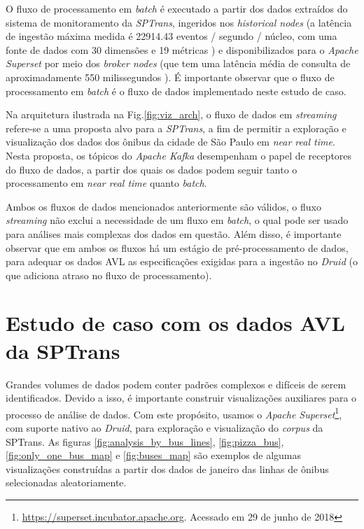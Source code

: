 \documentclass[
	12pt,				%
	oneside,			%
	a4paper,			%
	english,			%
	brazil				%
	]{abntex2ppgsi}
\begin{document}
{{O fluxo de processamento em \textit{batch} é executado a partir dos dados extraídos do sistema de monitoramento da \textit{SPTrans}, ingeridos nos \textit{historical nodes} (a latência de ingestão máxima medida é 22914.43 eventos / segundo / núcleo, com uma fonte de dados com 30 dimensões e 19 métricas \cite{yang2014druid}) e disponibilizados para o \textit{Apache Superset} por meio dos \textit{broker nodes} (que tem uma latência média de consulta de aproximadamente 550 milissegundos \cite{yang2014druid}). É importante observar que o fluxo de processamento em \textit{batch} é o fluxo de dados implementado neste estudo de caso.

Na arquitetura ilustrada na Fig.\ref{fig:viz_arch}, o fluxo de dados em \textit{streaming} refere-se a uma proposta alvo para a \textit{SPTrans}, a fim de permitir a exploração e visualização dos dados dos ônibus da cidade de São Paulo em \textit{near real time}. Nesta proposta, os tópicos do \textit{Apache Kafka} desempenham o papel de receptores do fluxo de dados, a partir dos quais os dados podem seguir tanto o processamento em \textit{near real time} quanto \textit{batch}.

Ambos os fluxos de dados mencionados anteriormente são válidos, o fluxo \textit{streaming} não exclui a necessidade de um fluxo em \textit{batch}, o qual pode ser usado para análises mais complexas dos dados em questão. Além disso, é importante observar que em ambos os fluxos há um estágio de pré-processamento de dados, para adequar os dados AVL as especificações exigidas para a ingestão no \textit{Druid} (o que adiciona atraso no fluxo de processamento).

\section{Estudo de caso com os dados AVL da SPTrans}
\label{viz_case}

Grandes volumes de dados podem conter padrões complexos e difíceis de serem identificados. Devido a isso, é importante construir visualizações auxiliares para o processo de análise de dados. Com este propósito, usamos o \textit{Apache Superset}\footnote{\url{https://superset.incubator.apache.org}. Acessado em 29 de junho de 2018}, com suporte nativo ao \textit{Druid}, para exploração e visualização do \textit{corpus} da SPTrans. As figuras \ref{fig:analysis_by_bus_lines}, \ref{fig:pizza_bus}, \ref{fig:only_one_bus_map} e \ref{fig:buses_map} são exemplos de algumas visualizações construídas a partir dos dados de janeiro das linhas de ônibus selecionadas aleatoriamente.

}}
\end{document}
